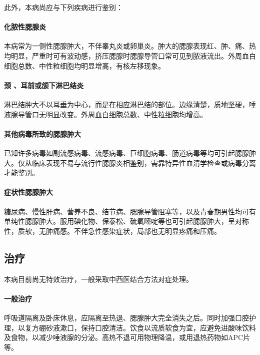 此外，本病尚应与下列疾病进行鉴别：

\paragraph{化脓性腮腺炎}

本病常为一侧性腮腺肿大，不伴睾丸炎或卵巢炎。肿大的腮腺表现红、肿、痛、热均明显，严重时可有波动感，挤压腮腺时腮腺导管口常可见到脓液流出。外周血白细胞总数、中性粒细胞均明显增高，有核左移现象。

\paragraph{颈 、耳前或颌下淋巴结炎}

淋巴结肿大不以耳垂为中心，而是在相应淋巴结的部位。边缘清楚，质地坚硬，唾液腺导管口无明显改变。外周血白细胞总数、中性粒细胞均增高。

\paragraph{其他病毒所致的腮腺肿大}

已知许多病毒如副流感病毒、流感病毒、巨细胞病毒、肠道病毒等均可引起腮腺肿大。仅从临床表现不易与流行性腮腺炎相鉴别，需靠特异性血清学检查或病毒分离才能鉴别。

\paragraph{症状性腮腺肿大}

糖尿病、慢性肝病、营养不良、结节病、腮腺导管阻塞等，以及青春期男性均可有单纯性腮腺肿大。服用碘化物、保泰松、硫氧嘧啶等也可引起腮腺肿大，呈对称性，质软，无肿痛感。不伴急性感染症状，局部也无明显疼痛和压痛。

\subsection{治疗}

本病目前尚无特效治疗，一般采取中西医结合方法对症处理。

\paragraph{一般治疗}

呼吸道隔离及卧床休息，应隔离至热退、腮腺肿大完全消失之后。同时加强口腔护理，以复方硼砂液漱口，保持口腔清洁。饮食以流质软食为宜，应避免进酸味饮料及食物，以减少唾液腺的分泌。高热不退可用物理降温，或用退热药物如APC片等。

